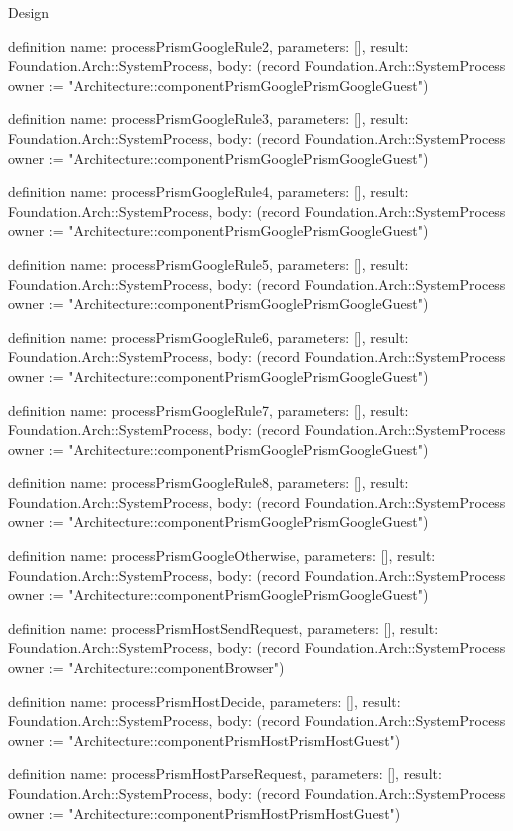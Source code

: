 \begin{lexlean}{Design}
\begin{semanticmodule}
definition{
  name: processPrismGoogleRule2,
  parameters: [],
  result: Foundation.Arch::SystemProcess,
  body: (record Foundation.Arch::SystemProcess {owner := "Architecture::componentPrismGooglePrismGoogleGuest"})
}

definition{
  name: processPrismGoogleRule3,
  parameters: [],
  result: Foundation.Arch::SystemProcess,
  body: (record Foundation.Arch::SystemProcess {owner := "Architecture::componentPrismGooglePrismGoogleGuest"})
}

definition{
  name: processPrismGoogleRule4,
  parameters: [],
  result: Foundation.Arch::SystemProcess,
  body: (record Foundation.Arch::SystemProcess {owner := "Architecture::componentPrismGooglePrismGoogleGuest"})
}

definition{
  name: processPrismGoogleRule5,
  parameters: [],
  result: Foundation.Arch::SystemProcess,
  body: (record Foundation.Arch::SystemProcess {owner := "Architecture::componentPrismGooglePrismGoogleGuest"})
}

definition{
  name: processPrismGoogleRule6,
  parameters: [],
  result: Foundation.Arch::SystemProcess,
  body: (record Foundation.Arch::SystemProcess {owner := "Architecture::componentPrismGooglePrismGoogleGuest"})
}

definition{
  name: processPrismGoogleRule7,
  parameters: [],
  result: Foundation.Arch::SystemProcess,
  body: (record Foundation.Arch::SystemProcess {owner := "Architecture::componentPrismGooglePrismGoogleGuest"})
}

definition{
  name: processPrismGoogleRule8,
  parameters: [],
  result: Foundation.Arch::SystemProcess,
  body: (record Foundation.Arch::SystemProcess {owner := "Architecture::componentPrismGooglePrismGoogleGuest"})
}

definition{
  name: processPrismGoogleOtherwise,
  parameters: [],
  result: Foundation.Arch::SystemProcess,
  body: (record Foundation.Arch::SystemProcess {owner := "Architecture::componentPrismGooglePrismGoogleGuest"})
}

definition{
  name: processPrismHostSendRequest,
  parameters: [],
  result: Foundation.Arch::SystemProcess,
  body: (record Foundation.Arch::SystemProcess {owner := "Architecture::componentBrowser"})
}

definition{
  name: processPrismHostDecide,
  parameters: [],
  result: Foundation.Arch::SystemProcess,
  body: (record Foundation.Arch::SystemProcess {owner := "Architecture::componentPrismHostPrismHostGuest"})
}

definition{
  name: processPrismHostParseRequest,
  parameters: [],
  result: Foundation.Arch::SystemProcess,
  body: (record Foundation.Arch::SystemProcess {owner := "Architecture::componentPrismHostPrismHostGuest"})
}


\end{semanticmodule}
\end{lexlean}
